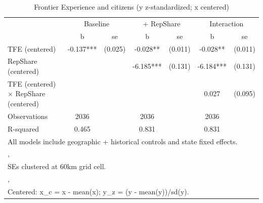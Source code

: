 \begin{table}[htbp]\centering
\def\sym#1{\ifmmode^{#1}\else\(^{#1}\)\fi}
\caption{Frontier Experience and citizens (y z-standardized; x centered)}
\begin{tabular}{l*{3}{cc}}
\toprule
                &\multicolumn{2}{c}{Baseline}&\multicolumn{2}{c}{ + RepShare}&\multicolumn{2}{c}{Interaction}\\
                &        b   &       se&        b   &       se&        b   &       se\\
\midrule
TFE (centered)  &   -0.137***&  (0.025)&   -0.028** &  (0.011)&   -0.028** &  (0.011)\\
RepShare (centered)&            &         &   -6.185***&  (0.131)&   -6.184***&  (0.131)\\
TFE (centered) $\times$ RepShare (centered)&            &         &            &         &    0.027   &  (0.095)\\
\midrule
Observations    &     2036   &         &     2036   &         &     2036   &         \\
R-squared       &    0.465   &         &    0.831   &         &    0.831   &         \\
\bottomrule
\multicolumn{7}{l}{\footnotesize All models include geographic + historical controls and state fixed effects.}\\
\multicolumn{7}{l}{\footnotesize ,}\\
\multicolumn{7}{l}{\footnotesize SEs clustered at 60km grid cell.}\\
\multicolumn{7}{l}{\footnotesize ,}\\
\multicolumn{7}{l}{\footnotesize Centered: x\_c = x - mean(x); y\_z = (y - mean(y))/sd(y).}\\
\end{tabular}
\end{table}
